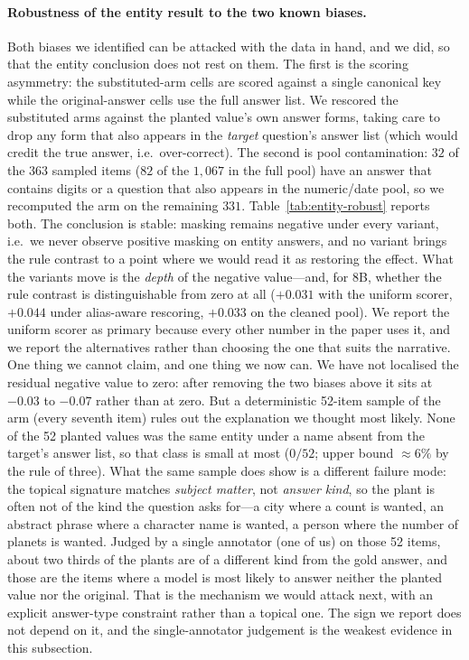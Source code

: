 \documentclass[11pt]{article}
\begin{document}
\paragraph{Robustness of the entity result to the two known biases.} Both biases we
identified can be attacked with the data in hand, and we did, so that the entity conclusion
does not rest on them. The first is the scoring asymmetry: the substituted-arm cells are
scored against a single canonical key while the original-answer cells use the full answer
list. We rescored the substituted arms against the planted value's own answer forms, taking
care to drop any form that also appears in the \emph{target} question's answer list (which
would credit the true answer, i.e.\ over-correct). The second is pool contamination: $32$ of
the $363$ sampled items ($82$ of the $1{,}067$ in the full pool) have an answer that contains
digits or a question that also appears in the numeric/date pool, so we recomputed the arm on
the remaining $331$. Table~\ref{tab:entity-robust}
reports both. The conclusion is stable: masking remains negative under every variant, i.e.\ we
never observe positive masking on entity answers, and no variant brings the rule contrast to
a point where we would read it as restoring the effect. What the variants move is the
\emph{depth} of the negative value---and, for 8B, whether the rule contrast is distinguishable
from zero at all ($+0.031$ with the uniform scorer, $+0.044$ under alias-aware rescoring,
$+0.033$ on the cleaned pool). We report the uniform scorer as primary because every other
number in the paper uses it, and we report the alternatives rather than choosing the one that
suits the narrative. One thing we cannot claim, and one thing we now can. We have not
localised the residual negative value to zero: after removing the two biases above it sits at
$-0.03$ to $-0.07$ rather than at zero. But a deterministic 52-item sample of the arm (every
seventh item) rules out the explanation we thought most likely. None of the 52 planted values
was the same entity under a name absent from the target's answer list, so that class is small
at most ($0/52$; upper bound $\approx 6\%$ by the rule of three). What the same sample does
show is a different failure mode: the topical signature matches \emph{subject matter}, not
\emph{answer kind}, so the plant is often not of the kind the question asks for---a city where
a count is wanted, an abstract phrase where a character name is wanted, a person where the
number of planets is wanted. Judged by a single annotator (one of us) on those 52 items, about
two thirds of the plants are of a different kind from the gold answer, and those are the items
where a model is most likely to answer neither the planted value nor the original. That is the
mechanism we would attack next, with an explicit answer-type constraint rather than a topical
one. The sign we report does not depend on it, and the single-annotator judgement is the
weakest evidence in this subsection.
\end{document}
